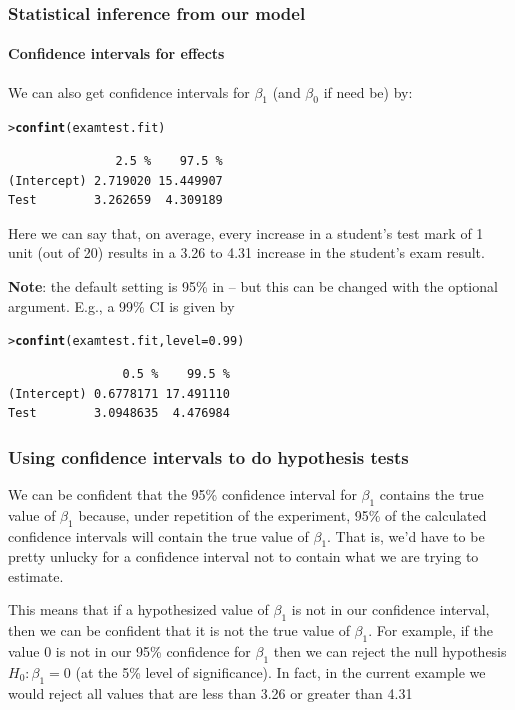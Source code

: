 \documentclass{beamer}\usepackage[]{graphicx}\usepackage[]{xcolor}
\makeatletter
\newcommand{\hlnum}[1]{\textcolor[rgb]{0.686,0.059,0.569}{#1}}%
\newcommand{\hlstd}[1]{\textcolor[rgb]{0.345,0.345,0.345}{#1}}%
\newcommand{\hlkwc}[1]{\textcolor[rgb]{0.333,0.667,0.333}{#1}}%
\newcommand{\hlkwd}[1]{\textcolor[rgb]{0.737,0.353,0.396}{\textbf{#1}}}%
\newenvironment{kframe}{%
 \def\at@end@of@kframe{}%
 \ifinner\ifhmode%
  \def\at@end@of@kframe{\end{minipage}}%
  \begin{minipage}{\columnwidth}%
 \fi\fi%
 \def\FrameCommand##1{\hskip\@totalleftmargin \hskip-\fboxsep
 \colorbox{shadecolor}{##1}\hskip-\fboxsep
     \hskip-\linewidth \hskip-\@totalleftmargin \hskip\columnwidth}%
 \MakeFramed {\advance\hsize-\width
   \@totalleftmargin\z@ \linewidth\hsize
   \@setminipage}}%
 {\par\unskip\endMakeFramed%
 \at@end@of@kframe}
\newenvironment{knitrout}{}{} %
\makeatother
\begin{document}
\begin{frame}[fragile]
\frametitle{Statistical inference from our model}
\framesubtitle{Confidence intervals for effects}

We can also get confidence intervals for $\beta_1$ (and $\beta_0$ if need be) by:
\begin{knitrout}\scriptsize
{}\color{fgcolor}\begin{kframe}
\begin{alltt}
\hlstd{> }\hlkwd{confint}\hlstd{(examtest.fit)}
\end{alltt}
\begin{verbatim}
               2.5 %    97.5 %
(Intercept) 2.719020 15.449907
Test        3.262659  4.309189
\end{verbatim}
\end{kframe}
\end{knitrout}

Here we can say that, on average,  every increase in a student's test mark of 1 unit (out of 20) results in a 3.26 to 4.31 increase in the student's exam result.

\medskip
\textbf{Note}: the default setting is 95\% in  -- but this can be changed with the optional  argument. E.g., a 99\% CI is given by
\begin{knitrout}\scriptsize
{}\color{fgcolor}\begin{kframe}
\begin{alltt}
\hlstd{> }\hlkwd{confint}\hlstd{(examtest.fit,}\hlkwc{level}\hlstd{=}\hlnum{0.99}\hlstd{)}
\end{alltt}
\begin{verbatim}
                0.5 %    99.5 %
(Intercept) 0.6778171 17.491110
Test        3.0948635  4.476984
\end{verbatim}
\end{kframe}
\end{knitrout}

\end{frame}


\begin{frame}[fragile]
\frametitle{Using confidence intervals to do hypothesis tests}

We can be confident that the 95\% confidence interval for $\beta_1$ contains the true value of $\beta_1$ because, under repetition of the experiment, 95\% of the calculated confidence intervals will contain the true value of $\beta_1$. That is, we'd have to be pretty unlucky for a confidence interval not to contain what we are trying to estimate.
\medskip

This means that if a hypothesized value of $\beta_1$ is not in our confidence interval, then we can be confident that it is not the true value of $\beta_1$. For example, if the value $0$ is not in our 95\% confidence for $\beta_1$ then we can reject the null hypothesis $H_0: \beta_1=0$ (at the 5\% level of significance). In fact, in the current example we would reject all values that are less than 3.26 or greater than 4.31

\end{frame}
\end{document}
